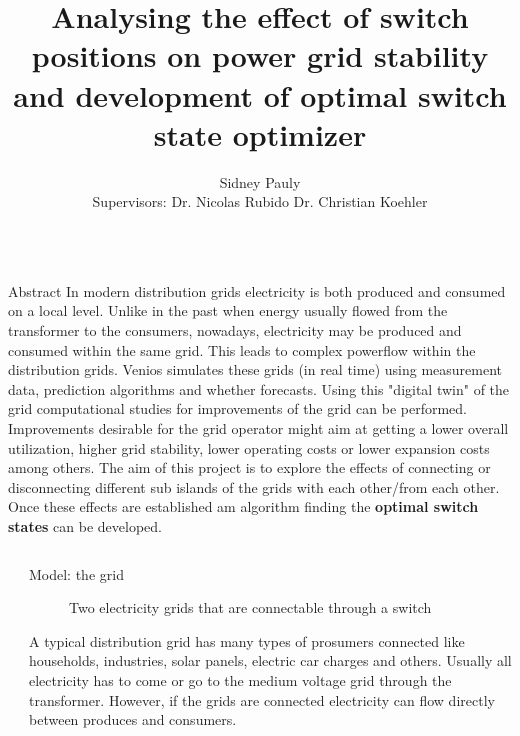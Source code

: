 \documentclass[final]{beamer}
\title{Analysing the effect of switch positions on power grid stability and development of optimal switch state optimizer}
\author{Sidney Pauly\inst{1} \inst{2}\\ Supervisors: Dr. Nicolas Rubido\inst{1} Dr. Christian Koehler\inst{2}}
\institute[shortinst]{\inst{1} University of Aberdeen \samelineand \inst{2} Venios GmbH}
\newlength{\sepwidth}
\newlength{\colwidth}
\newcommand{\separatorcolumn}{\begin{column}{\sepwidth}\end{column}}
\begin{document}
\begin{frame}[t]

  \begin{columns}[t]

    \begin{column}{}


      \begin{block}{Abstract}
        In modern distribution grids electricity is both produced and consumed on a local level.
        Unlike in the past when energy usually flowed from the transformer to the consumers, nowadays, electricity
        may be produced and consumed within the same grid. This leads to complex powerflow within the distribution
        grids. Venios simulates these grids (in real time) using measurement data, prediction algorithms and whether
        forecasts. Using this "digital twin" of the grid computational studies for improvements of the grid
        can be performed. Improvements desirable for the grid operator might aim at getting a lower overall utilization, higher
        grid stability, lower operating costs or lower expansion costs among others\autocite{Venios}.
        The aim of this project is to explore the effects of connecting or disconnecting different
        sub islands of the grids with each other/from each other. Once these effects are established am algorithm
        finding the \textbf{optimal switch states} can be developed.
      \end{block}

    \end{column}

  \end{columns}

\begin{columns}[t]


\separatorcolumn

\begin{column}{\colwidth}

  \begin{block}{Model: the grid}

    \begin{figure}
      \centering
      
      \caption{Two electricity grids that are connectable through a switch}
      \label{fig:simple_grid}
    \end{figure}

    A typical distribution grid has many types of prosumers connected like households, industries, solar panels, electric car charges and others.
    Usually all electricity has to come or go to the medium voltage grid through the transformer. However, if the grids are connected
    electricity can flow directly between produces and consumers.


\end{block}
\end{column}
\end{columns}
\end{frame}
\end{document}
